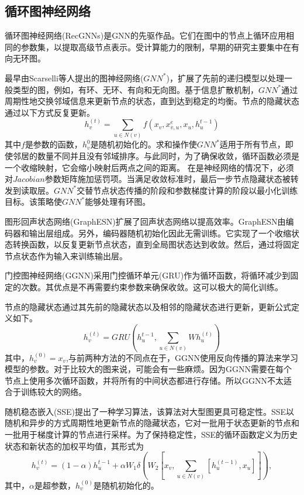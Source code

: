 \subsection{循环图神经网络}
循环图神经网络(RecGNNs)是GNN的先驱作品。它们在图中的节点上循环应用相同的参数集，以提取高级节点表示。受计算能力的限制，早期的研究主要集中在有向无环图。

最早由Scarselli等人提出的图神经网络($GNN^*$)\cite{scarselli2008graph}，扩展了先前的递归模型以处理一般类型的图，例如，有环、无环、有向和无向图。基于信息扩散机制，$GNN^*$通过周期性地交换邻域信息来更新节点的状态，直到达到稳定的均衡。节点的隐藏状态通过以下方式反复更新。
\[
h_v^{(t)}=\sum_{u\in N(v)}f(x_v,x^e_{v,u},x_u,h_u^{t-1})
\]
其中$f$是参数的函数，$h_v^{0}$是随机初始化的。求和操作使$GNN^*$适用于所有节点，即使邻居的数量不同并且没有邻域排序。与此同时，为了确保收敛，循环函数必须是一个收缩映射，它会缩小映射后两点之间的距离。
在是神经网络的情况下，必须对$Jacobian$参数矩阵施加惩罚项。当满足收敛标准时，最后一步节点隐藏状态被转发到读取层。$GNN^*$交替节点状态传播的阶段和参数梯度计算的阶段以最小化训练目标。该策略使$GNN^*$能够处理有环图。

图形回声状态网络(GraphESN)扩展了回声状态网络以提高效率。GraphESN由编码器和输出层组成。另外，编码器随机初始化因此无需训练。它实现了一个收缩状态转换函数，以反复更新节点状态，直到全局图状态达到收敛。然后，通过将固定节点状态作为输入来训练输出层。

门控图神经网络(GGNN)采用门控循环单元(GRU)作为循环函数，将循环减少到固定的次数。其优点是不再需要约束参数来确保收敛。这可以极大的简化训练。

节点的隐藏状态通过其先前的隐藏状态以及相邻的隐藏状态进行更新，更新公式定义如下。
\[
h_v^{(t)}=GRU(h_u^{t-1},\sum_{u\in N(v)} Wh_u^{(t)})
\]
其中，$h_v^{(0)}=x_v$,与前两种方法的不同点在于，GGNN使用反向传播的算法来学习模型的参数。对于比较大的图来说，可能会有一些麻烦。因为GGNN需要在每个节点上使用多次循环函数，并将所有的中间状态都进行存储。所以GGNN不太适合于训练较大的网络。

随机稳态嵌入(SSE)提出了一种学习算法，该算法对大型图更具可稳定性。SSE以随机和异步的方式周期性地更新节点的隐藏状态，它对一批用于状态更新的节点和一批用于梯度计算的节点进行采样。为了保持稳定性，SSE的循环函数定义为历史状态和新状态的加权平均值，其形式为
\[
h_v^{(t)}=(1-\alpha)h_u^{t-1}+\alpha W_1\delta(W_2[x_v,\sum_{u\in N(v)}[h_u^{(t-1)},x_u]]) ,
\]
其中，$\alpha$是超参数，$h_v^{(0)}$是随机初始化的。


